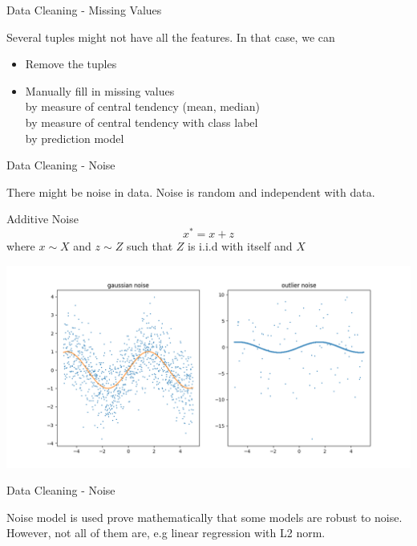 \begin{frame}{Data Cleaning - Missing Values}

Several tuples might not have all the features. In that case, we can

\begin{itemize}
\item Remove the tuples
\item Manually fill in missing values \\
by measure of central tendency (mean, median) \\ 
by measure of central tendency with class label \\ 
by prediction model \\
\end{itemize}
\end{frame}

\begin{frame}{Data Cleaning - Noise}

There might be noise in data. Noise is random and independent with data.
\begin{exampleblock}{Additive Noise}
    \begin{equation}
        x^{*} = x + z
    \end{equation}
    where $x \sim X$ and $z \sim Z$ such that $Z$ is i.i.d with itself and $X$
\end{exampleblock}
\begin{center}
\includegraphics[keepaspectratio, scale=0.25]{assets/noise_example.png}
\end{center}
\end{frame}

\begin{frame}{Data Cleaning - Noise}

Noise model is used prove mathematically that some models are robust to noise. \\ However, not all of them are, e.g linear regression with L2 norm.

\end{frame}

